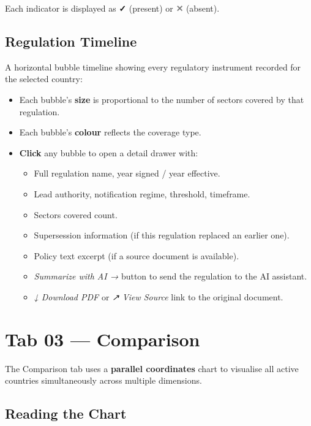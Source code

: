 \documentclass[12pt,a4paper]{article}
\newcommand{\uielem}[1]{\textit{#1}}
\begin{document}
Each indicator is displayed as \textcolor{prismgreen}{\textbf{✓}} (present) or \textcolor{gray}{\textbf{✕}} (absent).

\subsection{Regulation Timeline}

A horizontal bubble timeline showing every regulatory instrument recorded for the selected country:

\begin{itemize}
  \item Each bubble's \textbf{size} is proportional to the number of sectors covered by that regulation.
  \item Each bubble's \textbf{colour} reflects the coverage type.
  \item \textbf{Click} any bubble to open a detail drawer with:
    \begin{itemize}
      \item Full regulation name, year signed / year effective.
      \item Lead authority, notification regime, threshold, timeframe.
      \item Sectors covered count.
      \item Supersession information (if this regulation replaced an earlier one).
      \item Policy text excerpt (if a source document is available).
      \item \uielem{Summarize with AI →} button to send the regulation to the AI assistant.
      \item \uielem{↓ Download PDF} or \uielem{↗ View Source} link to the original document.
    \end{itemize}
\end{itemize}

\section{Tab 03 — Comparison}
\label{sec:compare}

The Comparison tab uses a \textbf{parallel coordinates} chart to visualise all active countries simultaneously across multiple dimensions.

\subsection{Reading the Chart}
\end{document}
